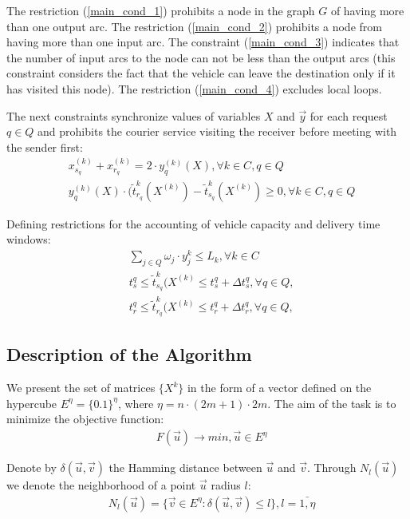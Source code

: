 \documentclass[]{TAACpaper}
\begin{document}
The restriction (\ref{main_cond_1}) prohibits a node in the graph $G$ of having more than one output arc. The restriction (\ref{main_cond_2}) prohibits a node from having more than one input arc.  The constraint (\ref{main_cond_3}) indicates that the number of input arcs to the node can not be less than the output arcs (this constraint considers the fact that the vehicle can leave the destination only if it has visited this node). The restriction (\ref{main_cond_4}) excludes local loops.

The next constraints synchronize values of variables $X$ and $\vec{y}$ for each request $q \in Q$ and prohibits the courier service visiting the receiver before meeting with the sender first:
\begin{align} 
& x^{(k)}_{s_q} + x^{(k)}_{r_q} = 2 \cdot y^{(k)}_{q}(X), \forall k \in C, q \in Q  \\
& y^{(k)}_{q}(X) \cdot (\tilde{t}^k_{r_q}(X^{(k)})-\tilde{t}^k_{s_q}(X^{(k)})\ge{0}, \forall k \in C, q \in Q
\end{align}

Defining restrictions for the accounting of vehicle capacity and delivery time windows:
\begin{align} 
& \sum_{j\in{Q}} \omega_j \cdot y_{j}^{k} \leq L_k, \forall{k}\in{C}\\
& t_{s}^{q} \leq \tilde{t}^k_{s_q}(X^{(k)} \leq t_{s}^{q}+ \Delta{t_{s}^{q}}, \forall q \in Q, \label{tws_cond} \\
& t_{r}^{q} \leq \tilde{t}^k_{r_q}(X^{(k)} \leq t_{r}^{q}+ \Delta{t_{r}^{q}}, \forall q \in Q, \label{twr_cond}
\end{align}



\subsection{Description of the Algorithm}
We present the set of matrices $\{X^k\}$ in the form of a vector defined on the hypercube $E^\eta=\{0.1\}^\eta$, where $\eta=n\cdot(2m+1)\cdot 2m$. The aim of the task is to minimize the objective function:
\begin{align} 
& F(\vec{u})\to min,\vec{u}\in E^{\eta}
\end{align}	

Denote by $\delta(\vec{u},\vec{v})$ the Hamming distance between $\vec{u}$ and $\vec{v}$. Through $N_l(\vec{u})$ we denote the neighborhood of a point $\vec{u}$ radius $l$\cite{vrp_shafeyev}:
\begin{align} 
& N_l(\vec{u})=\{\vec{v} \in E^{\eta}:\delta(\vec{u},\vec{v})\le l \}, l=\bar{1,\eta}
\end{align}	
\end{document}
